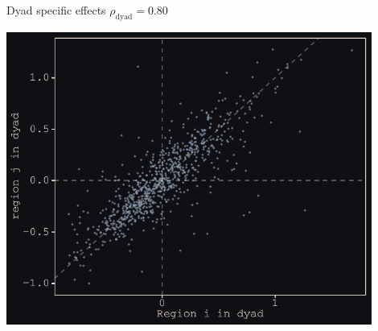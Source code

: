\documentclass{beamer}
\begin{document}
\begin{frame}{Dyad specific effects $\rho_{\text{dyad}} = 0.80$}
				\begin{center}
		\includegraphics[width=0.9\textwidth]{../../fig/dyad}
	\end{center}
\end{frame}
\end{document}
